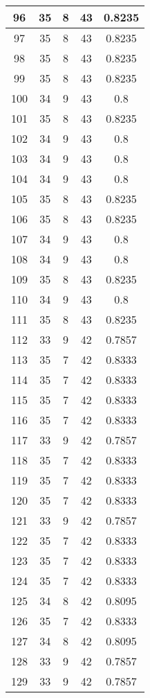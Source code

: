 \documentclass[letterpaper, 12pt]{article}
\begin{document}
\begin{longtable}{|c|c|c|c|c|}
\hline
96 & 35 & 8 & 43 & 0.8235 \\
\hline
97 & 35 & 8 & 43 & 0.8235 \\
\hline
98 & 35 & 8 & 43 & 0.8235 \\
\hline
99 & 35 & 8 & 43 & 0.8235 \\
\hline
100 & 34 & 9 & 43 & 0.8 \\
\hline
101 & 35 & 8 & 43 & 0.8235 \\
\hline
102 & 34 & 9 & 43 & 0.8 \\
\hline
103 & 34 & 9 & 43 & 0.8 \\
\hline
104 & 34 & 9 & 43 & 0.8 \\
\hline
105 & 35 & 8 & 43 & 0.8235 \\
\hline
106 & 35 & 8 & 43 & 0.8235 \\
\hline
107 & 34 & 9 & 43 & 0.8 \\
\hline
108 & 34 & 9 & 43 & 0.8 \\
\hline
109 & 35 & 8 & 43 & 0.8235 \\
\hline
110 & 34 & 9 & 43 & 0.8 \\
\hline
111 & 35 & 8 & 43 & 0.8235 \\
\hline
112 & 33 & 9 & 42 & 0.7857 \\
\hline
113 & 35 & 7 & 42 & 0.8333 \\
\hline
114 & 35 & 7 & 42 & 0.8333 \\
\hline
115 & 35 & 7 & 42 & 0.8333 \\
\hline
116 & 35 & 7 & 42 & 0.8333 \\
\hline
117 & 33 & 9 & 42 & 0.7857 \\
\hline
118 & 35 & 7 & 42 & 0.8333 \\
\hline
119 & 35 & 7 & 42 & 0.8333 \\
\hline
120 & 35 & 7 & 42 & 0.8333 \\
\hline
121 & 33 & 9 & 42 & 0.7857 \\
\hline
122 & 35 & 7 & 42 & 0.8333 \\
\hline
123 & 35 & 7 & 42 & 0.8333 \\
\hline
124 & 35 & 7 & 42 & 0.8333 \\
\hline
125 & 34 & 8 & 42 & 0.8095 \\
\hline
126 & 35 & 7 & 42 & 0.8333 \\
\hline
127 & 34 & 8 & 42 & 0.8095 \\
\hline
128 & 33 & 9 & 42 & 0.7857 \\
\hline
129 & 33 & 9 & 42 & 0.7857 \\
\hline

\end{longtable}
\end{document}
